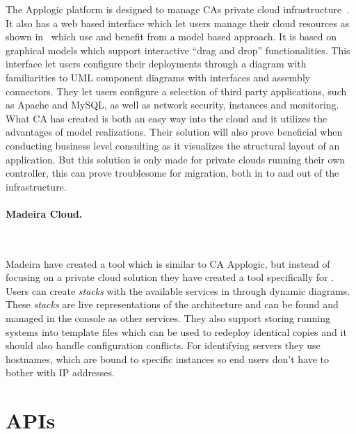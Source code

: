 The Applogic platform is designed to manage CAs private cloud 
infrastructure~\cite{introducing-cloud-services}.
It also has a web based interface which let users manage their cloud resources 
as shown in~ which use and benefit from a model based approach.
It is based on graphical models which support interactive ``drag and drop'' functionalities.
This interface let users configure their deployments through a diagram with familiarities to 
UML component diagrams with interfaces and assembly connectors. 
They let users configure a selection of third party applications, 
such as Apache and MySQL, as well as network security, instances and monitoring. 
What CA has created is both an easy way into the cloud and it utilizes 
the advantages of model realizations. 
Their solution will also prove beneficial when conducting business level consulting
as it visualizes the structural layout of an application.
But this solution is only made for private clouds running their own controller, 
this can prove troublesome for migration, both in to and out of the infrastructure.

\paragraph{Madeira Cloud.}~\cite{madeiracloud}



Madeira have created a tool which is similar to CA Applogic, but instead of focusing
on a private cloud solution they have created a tool specifically for  .
Users can create \emph{stacks} with the available services in  through 
dynamic diagrams.
These \emph{stacks} are live representations of the architecture and can be found 
and managed in the  console as other  services.
They also support storing running systems into template files which can be used
to redeploy identical copies and it should also handle configuration conflicts.
For identifying servers they use hostnames, which are bound to specific instances 
so end users don't have to bother with IP addresses.

\section{APIs}

